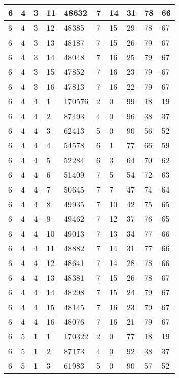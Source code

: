 \begin{table}[!ht]
\begin{tabular}{|l|l|l|l|l|l|l|l|l|l|}
        6 & 4 & 3 & 11 & 48632 & 7 & 14 & 31 & 78 & 66 \\ \hline
        6 & 4 & 3 & 12 & 48385 & 7 & 15 & 29 & 78 & 67 \\ \hline
        6 & 4 & 3 & 13 & 48187 & 7 & 15 & 26 & 79 & 67 \\ \hline
        6 & 4 & 3 & 14 & 48048 & 7 & 16 & 25 & 79 & 67 \\ \hline
        6 & 4 & 3 & 15 & 47852 & 7 & 16 & 23 & 79 & 67 \\ \hline
        6 & 4 & 3 & 16 & 47813 & 7 & 16 & 22 & 79 & 67 \\ \hline
        6 & 4 & 4 & 1 & 170576 & 2 & 0 & 99 & 18 & 19 \\ \hline
        6 & 4 & 4 & 2 & 87493 & 4 & 0 & 96 & 38 & 37 \\ \hline
        6 & 4 & 4 & 3 & 62413 & 5 & 0 & 90 & 56 & 52 \\ \hline
        6 & 4 & 4 & 4 & 54578 & 6 & 1 & 77 & 66 & 59 \\ \hline
        6 & 4 & 4 & 5 & 52284 & 6 & 3 & 64 & 70 & 62 \\ \hline
        6 & 4 & 4 & 6 & 51409 & 7 & 5 & 54 & 72 & 63 \\ \hline
        6 & 4 & 4 & 7 & 50645 & 7 & 7 & 47 & 74 & 64 \\ \hline
        6 & 4 & 4 & 8 & 49935 & 7 & 10 & 42 & 75 & 65 \\ \hline
        6 & 4 & 4 & 9 & 49462 & 7 & 12 & 37 & 76 & 65 \\ \hline
        6 & 4 & 4 & 10 & 49013 & 7 & 13 & 34 & 77 & 66 \\ \hline
        6 & 4 & 4 & 11 & 48882 & 7 & 14 & 31 & 77 & 66 \\ \hline
        6 & 4 & 4 & 12 & 48641 & 7 & 14 & 28 & 78 & 66 \\ \hline
        6 & 4 & 4 & 13 & 48381 & 7 & 15 & 26 & 78 & 67 \\ \hline
        6 & 4 & 4 & 14 & 48298 & 7 & 15 & 24 & 79 & 67 \\ \hline
        6 & 4 & 4 & 15 & 48145 & 7 & 16 & 23 & 79 & 67 \\ \hline
        6 & 4 & 4 & 16 & 48076 & 7 & 16 & 21 & 79 & 67 \\ \hline
        6 & 5 & 1 & 1 & 170322 & 2 & 0 & 77 & 18 & 19 \\ \hline
        6 & 5 & 1 & 2 & 87173 & 4 & 0 & 92 & 38 & 37 \\ \hline
        6 & 5 & 1 & 3 & 61983 & 5 & 0 & 90 & 57 & 52 \\ \hline

\end{tabular}
\end{table}
